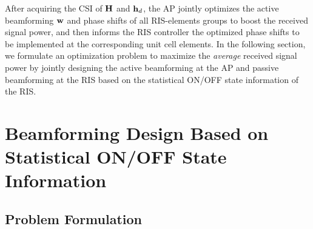 \documentclass[draftclsnofoot,onecolumn,12pt]{IEEEtran}
\begin{document}
			After acquiring the CSI of $\bf H$ and ${\bf h}_d$, the AP jointly optimizes the active beamforming $\bf w$ and phase shifts of all RIS-elements groups to boost the received signal power, 
			and then informs the RIS controller the optimized phase shifts to be implemented at the corresponding unit cell elements. 
			In the following section, we formulate an optimization problem to maximize the {\it average} received signal power by jointly designing the active beamforming at the AP and passive beamforming at the RIS based on the statistical ON/OFF state information of the RIS. 

\section{Beamforming Design Based on Statistical ON/OFF State Information}\label{beamforming2}

\subsection{Problem Formulation}
\end{document}
